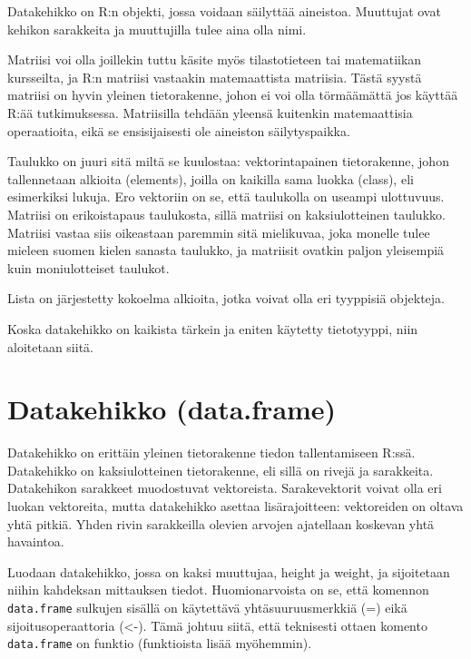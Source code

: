 \documentclass[
]{book}
\begin{document}
Datakehikko on R:n objekti, jossa voidaan säilyttää aineistoa. Muuttujat ovat kehikon sarakkeita ja muuttujilla tulee aina olla nimi.

Matriisi voi olla joillekin tuttu käsite myös tilastotieteen tai matematiikan kursseilta, ja R:n matriisi vastaakin matemaattista matriisia. Tästä syystä matriisi on hyvin yleinen tietorakenne, johon ei voi olla törmäämättä jos käyttää R:ää tutkimuksessa. Matriisilla tehdään yleensä kuitenkin matemaattisia operaatioita, eikä se ensisijaisesti ole aineiston säilytyspaikka.

Taulukko on juuri sitä miltä se kuulostaa: vektorintapainen tietorakenne, johon tallennetaan alkioita (elements), joilla on kaikilla sama luokka (class), eli esimerkiksi lukuja. Ero vektoriin on se, että taulukolla on useampi ulottuvuus. Matriisi on erikoistapaus taulukosta, sillä matriisi on kaksiulotteinen taulukko. Matriisi vastaa siis oikeastaan paremmin sitä mielikuvaa, joka monelle tulee mieleen suomen kielen sanasta taulukko, ja matriisit ovatkin paljon yleisempiä kuin moniulotteiset taulukot.

Lista on järjestetty kokoelma alkioita, jotka voivat olla eri tyyppisiä objekteja.

Koska datakehikko on kaikista tärkein ja eniten käytetty tietotyyppi, niin aloitetaan siitä.

\hypertarget{data-frame}{%
\section{Datakehikko (data.frame)}\label{data-frame}}

Datakehikko on erittäin yleinen tietorakenne tiedon tallentamiseen R:ssä. Datakehikko on kaksiulotteinen tietorakenne, eli sillä on rivejä ja sarakkeita. Datakehikon sarakkeet muodostuvat vektoreista. Sarakevektorit voivat olla eri luokan vektoreita, mutta datakehikko asettaa lisärajoitteen: vektoreiden on oltava yhtä pitkiä. Yhden rivin sarakkeilla olevien arvojen ajatellaan koskevan yhtä havaintoa.

Luodaan datakehikko, jossa on kaksi muuttujaa, height ja weight, ja sijoitetaan niihin kahdeksan mittauksen tiedot. Huomionarvoista on se, että komennon \texttt{data.frame} sulkujen sisällä on käytettävä yhtäsuuruusmerkkiä (=) eikä sijoitusoperaattoria (\textless-). Tämä johtuu siitä, että teknisesti ottaen komento \texttt{data.frame} on funktio (funktioista lisää myöhemmin).
\end{document}
